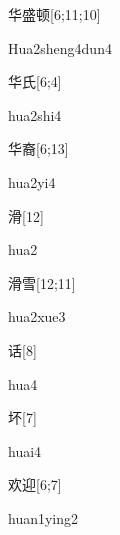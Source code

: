 \begin{verbete}{华盛顿}[6;11;10]
\begin{pronuncia}[\\]{Hua2sheng4dun4}
\end{pronuncia}
\end{verbete}

\begin{verbete}{华氏}[6;4]
\begin{pronuncia}{hua2shi4}
\end{pronuncia}
\end{verbete}

\begin{verbete}[hua2yi4]{华裔}[6;13]
\begin{pronuncia}{hua2yi4}
\end{pronuncia}
\end{verbete}

\begin{verbete}[hua2]{滑}[12]
\begin{pronuncia}{hua2}
\end{pronuncia}
\end{verbete}

\begin{verbete}{滑雪}[12;11]
\begin{pronuncia}{hua2xue3}
\end{pronuncia}
\end{verbete}

\begin{verbete}[hua4]{话}[8]
\begin{pronuncia}{hua4}
\end{pronuncia}
\end{verbete}

\begin{verbete}[huai4]{坏}[7]
\begin{pronuncia}{huai4}
\end{pronuncia}
\end{verbete}

\begin{verbete}{欢迎}[6;7]
\begin{pronuncia}{huan1ying2}
\end{pronuncia}
\end{verbete}

